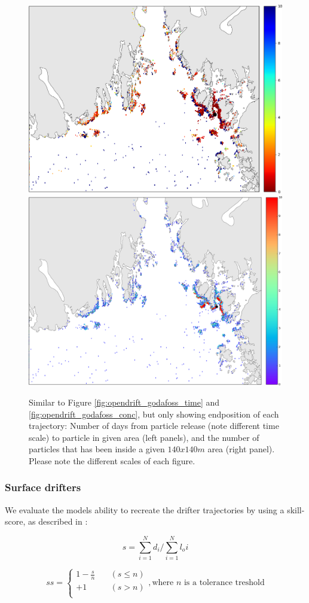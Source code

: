\begin{figure}[ht]
\centerline{
\includegraphics*[width=.5\textwidth]{Figurer/opendrift/opendrift_godafoss_shortest_time_zoom_endpos_crop}
\includegraphics*[width=.5\textwidth]{Figurer/opendrift/opendrift_godafoss_consentration_zoom_endpos_crop}
}
\caption{\small
Similar to Figure \ref{fig:opendrift_godafoss_time} and \ref{fig:opendrift_godafoss_conc}, but only showing endposition of each trajectory: Number of days from particle release (note different time scale) to particle in given area (left panels), and the number of particles that has been inside a given $140x140m$ area (right panel). Please note the different scales of each figure.}
\label{fig:opendrift_godafoss_endpos}
\end{figure}

\clearpage 
\subsubsection{Surface drifters}
We evaluate the models ability to recreate the drifter trajectories by using a skill-score, as described in \cite{liu:weisberg:2011}: 

$$s=\displaystyle\sum_{i=1}^{N} d_i / \displaystyle\sum_{i=1}^{N} l_oi$$

\[ ss = 
  \begin{cases}
    1 - \frac{s}{n}   & \quad (s \leq n)\\
    +1                & \quad (s > n)   \\ 
  \end{cases}
  , \text{where $n$ is a tolerance treshold}
\]

